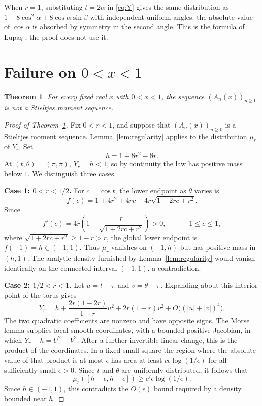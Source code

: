 \documentclass[11pt]{article}
\newtheorem{theorem}{Theorem}
\begin{document}
When $r=1$, substituting $t=2\alpha$ in \eqref{eq:Y}
gives the same distribution as
$1+8\cos^2\alpha+8\cos\alpha\sin\beta$ with independent uniform angles:
the absolute value of $\cos\alpha$ is absorbed by symmetry in the second
angle. This is the formula of Lupa\c{s} \cite{Lupas}; the proof does not
use it.

\section{Failure on \texorpdfstring{$0<x<1$}{0<x<1}}\label{sec:negative}
\begin{theorem}\label{thm:main}
For every fixed real $x$ with $0<x<1$, the sequence
$(A_n(x))_{n\ge0}$ is not a Stieltjes moment sequence.
\end{theorem}
\begin{proof}[Proof of Theorem~\ref{thm:main}]
Fix $0<r<1$, and suppose that $(A_n(x))_{n\ge0}$ is a Stieltjes moment
sequence.
Lemma~\ref{lem:regularity} applies to the distribution $\mu_r$ of $Y_r$.
Set
\[
 h=1+8r^2-8r.
\]
At $(t,\theta)=(\pi,\pi)$, $Y_r=h<1$, so by continuity the law has
positive mass below $1$. We distinguish three cases.

\medskip\noindent\textbf{Case 1: $0<r<1/2$.}
For $c=\cos t$, the lower endpoint as $\theta$ varies is
\[
 f(c)=1+4r^2+4rc-4r\sqrt{1+2rc+r^2}.
\]
Since
\[
 f'(c)=4r\left(1-\frac{r}{\sqrt{1+2rc+r^2}}\right)>0,
 \qquad -1\le c\le1,
\]
where $\sqrt{1+2rc+r^2}\ge1-r>r$, the global lower endpoint is
$f(-1)=h\in(-1,1)$. Thus $\mu_r$ vanishes on $(-1,h)$ but has positive
mass in $(h,1)$. The analytic density furnished by Lemma~\ref{lem:regularity}
would vanish identically on the connected interval $(-1,1)$, a contradiction.

\medskip\noindent\textbf{Case 2: $1/2<r<1$.}
Let $u=t-\pi$ and $v=\theta-\pi$. Expanding about this interior point of
the torus gives
\begin{equation}\label{eq:hessian}
 Y_r=h+\frac{2r(1-2r)}{1-r}u^2+2r(1-r)v^2
        +O\bigl((|u|+|v|)^4\bigr).
\end{equation}
The two quadratic coefficients are nonzero and have opposite signs.
The Morse lemma supplies local smooth coordinates, with a bounded positive
Jacobian, in which $Y_r-h=U^2-V^2$. After a further invertible linear change,
this is the product of the coordinates. In a fixed small square the region
where the absolute value of that product is at most $\epsilon$ has area
at least $c\epsilon\log(1/\epsilon)$ for all sufficiently small
$\epsilon>0$. Since $t$ and $\theta$ are uniformly distributed, it follows
that
\[
 \mu_r([h-\epsilon,h+\epsilon])
       \ge c'\epsilon\log(1/\epsilon).
\]
Since $h\in(-1,1)$, this contradicts the $O(\epsilon)$ bound required
by a density bounded near $h$.


\end{proof}
\end{document}
